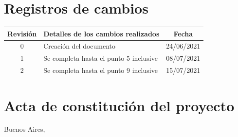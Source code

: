 \documentclass[
11pt, %
]{charter}
\begin{document}
\maketitle
\thispagestyle{empty}
\pagebreak


\thispagestyle{empty}
{\setlength{\parskip}{0pt}
\tableofcontents{}
}
\pagebreak


\section*{Registros de cambios}
\label{sec:registro}


\begin{table}[ht]
\label{tab:registro}
\centering
\begin{tabularx}{\linewidth}{@{}|c|X|c|@{}}
\hline
\rowcolor[HTML]{C0C0C0} 
Revisión & \multicolumn{1}{c|}{\cellcolor[HTML]{C0C0C0}Detalles de los cambios realizados} & Fecha      \\ \hline
0      & Creación del documento                                 & 24/06/2021 \\ \hline
1      & Se completa hasta el punto 5 inclusive                 & 08/07/2021 \\ \hline
2      & Se completa hasta el punto 9 inclusive                 & 15/07/2021 \\ \hline
\end{tabularx}
\end{table}

\pagebreak



\section*{Acta de constitución del proyecto}
\label{sec:acta}

\begin{flushright}
Buenos Aires, \fechaInicioName
\end{flushright}

\vspace{2cm}
\end{document}
